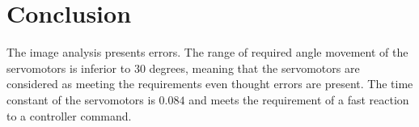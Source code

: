  

	\section*{Conclusion}
	
The image analysis presents errors. The range of required angle movement of the servomotors is inferior to $30$ degrees, meaning that the servomotors are considered as meeting the requirements even thought errors are present. The time constant of the servomotors is $0.084$ and meets the requirement of a fast reaction to a controller command.





